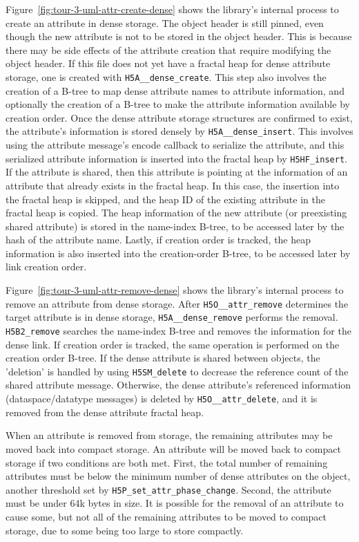 Figure~\ref{fig:tour-3-uml-attr-create-dense} shows the library's internal process to create an attribute in dense storage. The object header is still pinned, even though the new attribute is not to be stored in the object header. This is because there may be side effects of the attribute creation that require modifying the object header. If this file does not yet have a fractal heap for dense attribute storage, one is created with \texttt{H5A\_\_dense\_create}. This step also involves the creation of a B-tree to map dense attribute names to attribute information, and optionally the creation of a B-tree to make the attribute information available by creation order. Once the dense attribute storage structures are confirmed to exist, the attribute's information is stored densely by \texttt{H5A\_\_dense\_insert}. This involves using the attribute message's encode callback to serialize the attribute, and this serialized attribute information is inserted into the fractal heap by \texttt{H5HF\_insert}. If the attribute is shared, then this attribute is pointing at the information of an attribute that already exists in the fractal heap. In this case, the insertion into the fractal heap is skipped, and the heap ID of the existing attribute in the fractal heap is copied. The heap information of the new attribute (or preexisting shared attribute) is stored in the name-index B-tree, to be accessed later by the hash of the attribute name. Lastly, if creation order is tracked, the heap information is also inserted into the creation-order B-tree, to be accessed later by link creation order.

Figure~\ref{fig:tour-3-uml-attr-remove-dense} shows the library's internal process to remove an attribute from dense storage. After \texttt{H5O\_\_attr\_remove} determines the target attribute is in dense storage, \texttt{H5A\_\_dense\_remove} performs the removal. \texttt{H5B2\_remove} searches the name-index B-tree and removes the information for the dense link. If creation order is tracked, the same operation is performed on the creation order B-tree. If the dense attribute is shared between objects, the 'deletion' is handled by using \texttt{H5SM\_delete} to decrease the reference count of the shared attribute message. Otherwise, the dense attribute's referenced information (dataspace/datatype messages) is deleted by \texttt{H5O\_\_attr\_delete}, and it is removed from the dense attribute fractal heap.

When an attribute is removed from storage, the remaining attributes may be moved back into compact storage. An attribute will be moved back to compact storage if two conditions are both met. First, the total number of remaining attributes must be below the minimum number of dense attributes on the object, another threshold set by \texttt{H5P\_set\_attr\_phase\_change}. Second, the attribute must be under 64k bytes in size. It is possible for the removal of an attribute to cause some, but not all of the remaining attributes to be moved to compact storage, due to some being too large to store compactly. 

